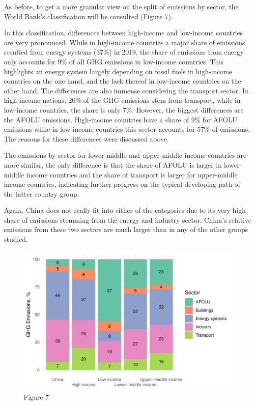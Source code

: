 \documentclass[
  12pt,
]{article}
\numberwithin{equation}{section}
\numberwithin{table}{section}
\numberwithin{figure}{section}
\begin{document}
As before, to get a more granular view on the split of emissions by
sector, the World Bank's classification will be consulted (Figure 7).

In this classification, differences between high-income and low-income
countries are very pronounced. While in high-income countries a major
share of emissions resulted from energy systems (37\%) in 2019, the
share of emissions from energy only accounts for 9\% of all GHG
emissions in low-income countries. This highlights an energy system
largely depending on fossil fuels in high-income countries on the one
hand, and the lack thereof in low-income countries on the other hand.
The differences are also immense considering the transport sector. In
high-income nations, 20\% of the GHG emissions stem from transport,
while in low-income countries, the share is only 7\%. However, the
biggest differences are the AFOLU emissions. High-income countries have
a share of 9\% for AFOLU emissions while in low-income countries this
sector accounts for 57\% of emissions. The reasons for these differences
were discussed above.

The emissions by sector for lower-middle and upper-middle income
countries are more similar, the only difference is that the share of
AFOLU is larger in lower-middle income countries and the share of
transport is larger for upper-middle income countries, indicating
further progress on the typical developing path of the latter country
group.

Again, China does not really fit into either of the categories due to
its very high share of emissions stemming from the energy and industry
sector. China's relative emissions from these two sectors are much
larger than in any of the other groups studied.

\begin{figure}
\centering
\includegraphics{Paper_files/figure-latex/unnamed-chunk-7-1.pdf}
\caption{Figure 7}
\end{figure}
\end{document}
